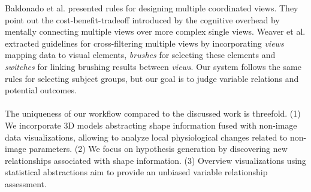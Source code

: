 \documentclass[journal]{style/vgtc} 			          %
\begin{document}
Baldonado et al. \cite{Baldonado2000} presented rules for designing multiple coordinated views.
%
They point out the cost-benefit-tradeoff introduced by the cognitive overhead by mentally connecting multiple views over more complex single views. %
%
Weaver et al. \cite{Weaver2010} extracted guidelines for cross-filtering multiple views by incorporating \emph{views} mapping data to visual elements, \emph{brushes} for selecting these elements and \emph{switches} for linking brushing results between \emph{views}.
%
Our system follows the same rules for selecting subject groups, but our goal is to judge variable relations and potential outcomes.
\\\\
The uniqueness of our workflow compared to the discussed work is threefold.
%
(1) We incorporate 3D models abstracting shape information fused with non-image data visualizations, allowing to analyze local physiological changes related to non-image parameters.
%
(2) We focus on hypothesis generation by discovering new relationships associated with shape information. %
%
(3) Overview visualizations using statistical abstractions aim to provide an unbiased variable relationship assessment.

\end{document}
